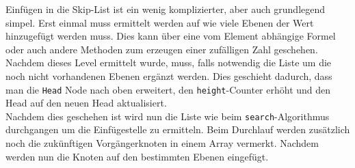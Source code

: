 \documentclass[
../AuD-Zusammenfassung.tex,
]
{subfiles}
\begin{document}
Einfügen in die Skip-List ist ein wenig komplizierter, aber auch grundlegend simpel. Erst einmal muss ermittelt werden auf wie viele Ebenen der Wert hinzugefügt werden muss. Dies kann über eine vom Element abhängige Formel oder auch andere Methoden zum erzeugen einer zufälligen Zahl geschehen. Nachdem dieses Level ermittelt wurde, muss, falls notwendig die Liste um die noch nicht vorhandenen Ebenen ergänzt werden. Dies geschieht dadurch, dass man die \texttt{Head} Node nach oben erweitert, den \texttt{height}-Counter erhöht und den Head auf den neuen Head aktualisiert.\\
Nachdem dies geschehen ist wird nun die Liste wie beim \texttt{search}-Algorithmus durchgangen um die Einfügestelle zu ermitteln. Beim Durchlauf werden zusätzlich noch die zukünftigen Vorgängerknoten in einem Array vermerkt.
Nachdem werden nun die Knoten auf den bestimmten Ebenen eingefügt.
\end{document}
